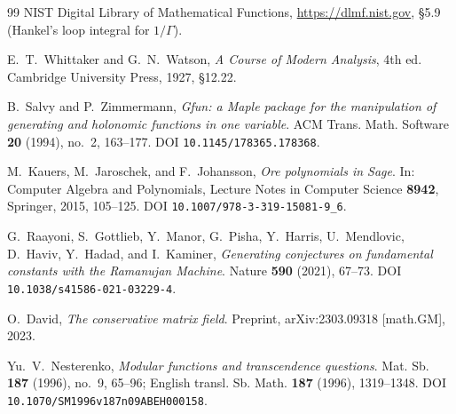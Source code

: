 \documentclass[11pt,reqno]{amsart}
\theoremstyle{plain}
\theoremstyle{definition}
\begin{document}
\begin{thebibliography}{99}
NIST Digital Library of Mathematical Functions, \url{https://dlmf.nist.gov}, \S5.9
(Hankel's loop integral for $1/\Gamma$).

E.~T.~Whittaker and G.~N.~Watson,
\emph{A Course of Modern Analysis}, 4th ed.
Cambridge University Press, 1927, \S12.22.

B.~Salvy and P.~Zimmermann,
\emph{Gfun: a Maple package for the manipulation of generating and holonomic functions in one
variable}.
ACM Trans. Math. Software \textbf{20} (1994), no.~2, 163--177.
DOI \texttt{10.1145/178365.178368}.

M.~Kauers, M.~Jaroschek, and F.~Johansson,
\emph{Ore polynomials in Sage}.
In: Computer Algebra and Polynomials, Lecture Notes in Computer Science \textbf{8942},
Springer, 2015, 105--125.
DOI \texttt{10.1007/978-3-319-15081-9\_6}.

G.~Raayoni, S.~Gottlieb, Y.~Manor, G.~Pisha, Y.~Harris, U.~Mendlovic, D.~Haviv, Y.~Hadad, and
I.~Kaminer,
\emph{Generating conjectures on fundamental constants with the Ramanujan Machine}.
Nature \textbf{590} (2021), 67--73.
DOI \texttt{10.1038/s41586-021-03229-4}.

O.~David,
\emph{The conservative matrix field}.
Preprint, arXiv:2303.09318 [math.GM], 2023.

Yu.~V.~Nesterenko,
\emph{Modular functions and transcendence questions}.
Mat. Sb. \textbf{187} (1996), no.~9, 65--96; English transl. Sb. Math. \textbf{187} (1996),
1319--1348.
DOI \texttt{10.1070/SM1996v187n09ABEH000158}.

\end{thebibliography}
\end{document}
